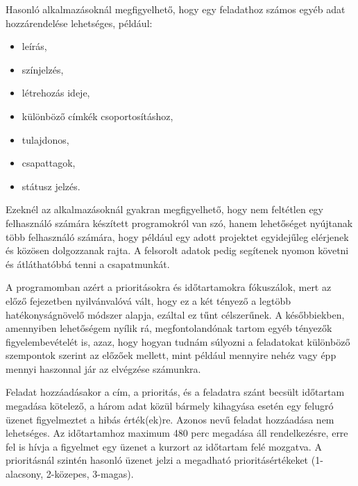 Hasonló alkalmazásoknál megfigyelhető, hogy egy feladathoz számos egyéb adat hozzárendelése lehetséges, például:

\begin{itemize}
	\item leírás,
	\item színjelzés,
	\item létrehozás ideje,
	\item különböző címkék csoportosításhoz,
	\item tulajdonos,
	\item csapattagok,
	\item státusz jelzés.
\end{itemize}

Ezeknél az alkalmazásoknál gyakran megfigyelhető, hogy nem feltétlen egy felhasználó számára készített programokról van szó, hanem lehetőséget nyújtanak több felhasználó számára, hogy például egy adott projektet egyidejűleg elérjenek és közösen dolgozzanak rajta. A felsorolt adatok pedig segítenek nyomon követni és átláthatóbbá tenni a csapatmunkát.

A programomban azért a prioritásokra és időtartamokra fókuszálok, mert az előző fejezetben nyilvánvalóvá vált, hogy ez a két tényező a legtöbb hatékonyságnövelő módszer alapja, ezáltal ez tűnt célszerűnek. A későbbiekben, amennyiben lehetőségem nyílik rá, megfontolandónak tartom egyéb tényezők figyelembevételét is, azaz, hogy hogyan tudnám súlyozni a feladatokat különböző szempontok szerint az előzőek mellett, mint például mennyire nehéz vagy épp mennyi haszonnal jár az elvégzése számunkra. 

Feladat hozzáadásakor a cím, a prioritás, és a feladatra szánt becsült időtartam megadása kötelező, a három adat közül bármely kihagyása esetén egy felugró üzenet figyelmeztet a hibás érték(ek)re. Azonos nevű feladat hozzáadása nem lehetséges. Az időtartamhoz maximum 480 perc megadása áll rendelkezésre, erre fel is hívja a figyelmet egy üzenet a kurzort az időtartam felé mozgatva. A prioritásnál szintén hasonló üzenet jelzi a megadható prioritásértékeket (1-alacsony, 2-közepes, 3-magas).

